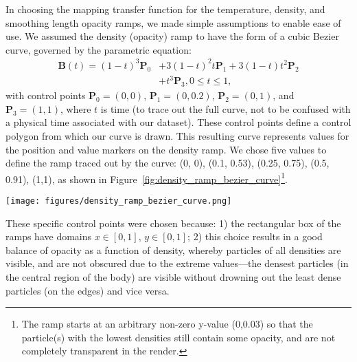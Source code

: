 \documentclass[fleqn,usenatbib,useAMS]{mnras}
\begin{document}
In choosing the mapping transfer function for the temperature, density, and smoothing length opacity ramps, we made simple assumptions to enable ease of use. We assumed the density (opacity) ramp to have the form of a cubic Bezier curve, governed by the parametric equation:
%
\begin{equation}
\begin{split}
    \textbf{B}(t)=(1-t)^3\textbf{P}_0 & + 3(1-t)^2 t \textbf{P}_1 + 3(1-t) t^2 \textbf{P}_2 \\  
    & +t^3 \textbf{P}_3, 0 \leq t \leq 1,
    \label{eq:CubicBezierCurve}
\end{split}
\end{equation}
%
with control points $\textbf{P}_0 = (0,0)$, $\textbf{P}_1 = (0,0.2)$, $\textbf{P}_2 = (0,1)$, and $\textbf{P}_3 = (1,1)$, where $t$ is time (to trace out the full curve, not to be confused with a physical time associated with our dataset). These control points define a control polygon from which our curve is drawn. This resulting curve represents values for the position and value markers on the density ramp. We chose five values to define the ramp traced out by the curve: (0, 0), (0.1, 0.53), (0.25, 0.75), (0.5, 0.91), (1,1), as shown in Figure~\ref{fig:density_ramp_bezier_curve}\footnote{The ramp starts at an arbitrary non-zero y-value (0,0.03) so that the particle(s) with the lowest densities still contain some opacity, and are not completely transparent in the render.}.
%
\begin{figure*}
\centering
\texttt{[image: figures/density\_ramp\_bezier\_curve.png]}
\caption{The density ramp, mapped to opacity in the shader, where density values increase from left to right from 0 to 3.4---its max value after pre-processing. The higher the `Value' indicated by the ramp, the more opaque (less transparent) each particle at that particular density will be. Values are determined by a cubic Bezier curve with the control points $\textbf{P}_0 = (0,0)$, $\textbf{P}_1 = (0,0.2)$, $\textbf{P}_2 = (0,1)$, and $\textbf{P}_3 = (1,1)$. The `Interpolation' between each point is also set to `Bezier'. Less dense particles (typically near the outer edges of the synestia) are less opaque, and more dense particles (typically concentrated in the center of the synestia) are more opaque.}
\label{fig:density_ramp_bezier_curve}
\end{figure*}
%
These specific control points were chosen because: 1) the rectangular box of the ramps have domains $x \in [0,1]$, $y \in [0,1]$; 2) this choice results in a good balance of opacity as a function of density, whereby particles of all densities are visible, and are not obscured due to the extreme values---the densest particles (in the central region of the body) are visible without drowning out the least dense particles (on the edges) and vice versa. \par 
\end{document}
